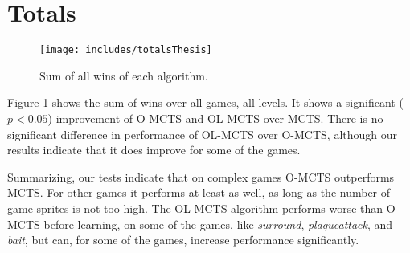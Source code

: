 \section{Totals}
\label{subsec:totals}

\begin{figure}
	\centering
	\texttt{[image: includes/totalsThesis]}
	\label{fig:total-results}
	\caption{Sum of all wins of each algorithm.}
\end{figure}

Figure \ref{fig:total-results} shows the sum of wins over all games, all levels.
It shows a significant ($p < 0.05$) improvement of O-MCTS and OL-MCTS over MCTS.
There is no significant difference in performance of OL-MCTS over O-MCTS,
although our results indicate that it does improve for some of the games.

Summarizing, our tests indicate that on complex games O-MCTS outperforms MCTS.
For other games it performs at least as well, as long as the number of game
sprites is not too high. 
The OL-MCTS algorithm performs worse than O-MCTS before learning, on some of the
games, like \textit{surround}, \textit{plaqueattack}, and \textit{bait}, but
can, for some of the games, increase performance significantly.

